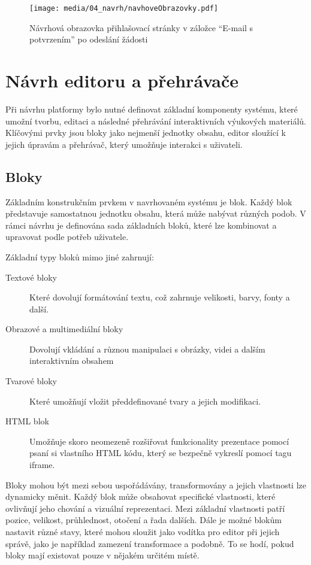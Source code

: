 \begin{figure}[ht!]
    \centering
    \texttt{[image: media/04\_navrh/navhoveObrazovky.pdf]}
    \caption{Návrhová obrazovka přihlašovací stránky v záložce \enquote{E-mail s potvrzením} po odeslání žádosti}\label{fig:navrhovaObrazovkaEmailAKod}
\end{figure}


\section{Návrh editoru a přehrávače}\label{text:navrh/editor_player}

Při návrhu platformy bylo nutné definovat základní komponenty systému, které umožní tvorbu, editaci a následné přehrávání interaktivních výukových materiálů. 
Klíčovými prvky jsou bloky jako nejmenší jednotky obsahu, editor sloužící k jejich úpravám a přehrávač, který umožňuje interakci s uživateli.

\subsection{Bloky}

Základním konstrukčním prvkem v navrhovaném systému je blok. 
Každý blok představuje samostatnou jednotku obsahu, která může nabývat různých podob. 
V rámci návrhu je definována sada základních bloků, které lze kombinovat a upravovat podle potřeb uživatele.

Základní typy bloků mimo jiné zahrnují:

\begin{description}
    \item[Textové bloky] Které dovolují formátování textu, což zahrnuje velikosti, barvy, fonty a další.
    \item[Obrazové a multimediální bloky] Dovolují vkládání a různou manipulaci s obrázky, videi a dalším interaktivním obsahem
    \item[Tvarové bloky] Které umožňují vložit předdefinované tvary a jejich modifikaci.
    \item[HTML blok] Umožňuje skoro neomezeně rozšiřovat funkcionality prezentace pomocí psaní si vlastního HTML kódu, který se bezpečně vykreslí pomocí tagu iframe.
\end{description}

Bloky mohou být mezi sebou uspořádávány, transformovány a jejich vlastnosti lze dynamicky měnit. 
Každý blok může obsahovat specifické vlastnosti, které ovlivňují jeho chování a vizuální reprezentaci.
Mezi základní vlastnosti patří pozice, velikost, průhlednost, otočení a řada dalších.
Dále je možné blokům nastavit různé stavy, které mohou sloužit jako vodítka pro editor při jejich správě, jako je například zamezení transformace a podobně.
To se hodí, pokud bloky mají existovat pouze v nějakém určitém místě.

